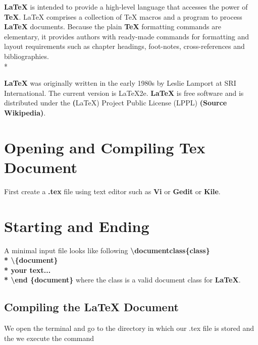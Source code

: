 \documentclass[12pt, a4paper]{article}
\newcommand*{\qcr}{\fontfamily{qcr}\selectfont}
\begin{document}
\textbf{LaTeX} is intended to provide a high-level language that accesses the
power of \textbf{TeX}. \LaTeX{} comprises a collection of TeX macros and a program
to process \textbf{LaTeX} documents. Because the plain \textbf{TeX} formatting commands are elementary, it provides authors with ready-made commands for formatting and layout requirements such as chapter headings, foot-notes, cross-references and bibliographies.
\\*

\textbf{LaTeX} was originally written in the early 1980s by Leslie Lamport at
SRI International. The current version is LaTeX2e. \textbf{LaTeX} is free software and is distributed under the \textbf(LaTeX) Project Public License (LPPL)
\textbf{(Source Wikipedia)}.

\section{Opening and Compiling Tex Document}

First create a \textbf{.tex} file using text editor such as \textbf{Vi} or \textbf{Gedit} or \textbf{Kile}.

\section{Starting and Ending}

A minimal input file looks like following
\textbf{\qcr \large
\newline \newline
\hspace*{1cm}\textbackslash documentclass\{class\}
\\*
\hspace*{1cm}\textbackslash \{document\}
\\*
\hspace*{1.8cm}your text...
\\*
\hspace*{1cm}\textbackslash end \{document\}
}
\newline \newline
where the class is a valid document class for \textbf{LaTeX}.

\subsection{Compiling the LaTeX Document}

We open the terminal and go to the directory in which our .tex file is
stored and the we execute the command\\
\end{document}
